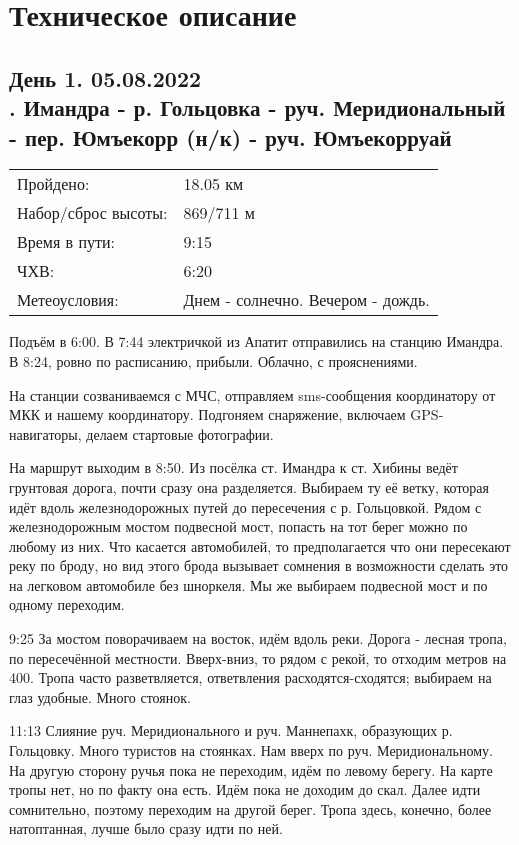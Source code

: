 \section{Техническое описание}
\subsection{День 1. 05.08.2022\\
. Имандра - р. Гольцовка - руч. Меридиональный - пер. Юмъекорр (н/к) - руч. Юмъекорруай}
\begin{tabular}{l p{12cm}}
\hline
Пройдено: & 18.05 км\\
Набор/сброс высоты: & 869/711 м\\
Время в пути: & 9:15\\
ЧХВ: & 6:20\\
Метеоусловия: & Днем - солнечно. Вечером - дождь.\\
\hline
\end{tabular}

Подъём в 6:00.
В 7:44 электричкой из Апатит отправились на станцию Имандра. В 8:24, ровно по расписанию, прибыли. Облачно, с прояснениями.

На станции созваниваемся с МЧС, отправляем sms-сообщения координатору от МКК и нашему координатору.
Подгоняем снаряжение, включаем GPS-навигаторы, делаем стартовые фотографии.

На маршрут выходим в 8:50. Из посёлка ст. Имандра к ст. Хибины ведёт грунтовая дорога, почти сразу она разделяется.
Выбираем ту её ветку, которая идёт вдоль железнодорожных путей до пересечения с р. Гольцовкой.
Рядом с железнодорожным мостом подвесной мост, попасть на тот берег можно по любому из них.
Что касается автомобилей, то предполагается что они пересекают реку по броду, но вид этого брода вызывает сомнения
в возможности сделать это на легковом автомобиле без шноркеля. Мы же выбираем подвесной мост и по одному переходим.

9:25 За мостом поворачиваем на восток, идём вдоль реки. Дорога - лесная тропа, по пересечённой местности.
Вверх-вниз, то рядом с рекой, то отходим метров на 400. Тропа часто разветвляется, ответвления расходятся-сходятся;
выбираем на глаз удобные. Много стоянок.

11:13 Слияние руч. Меридионального и руч. Маннепахк, образующих р. Гольцовку. Много туристов на стоянках.
Нам вверх по руч. Меридиональному. На другую сторону ручья пока не переходим, идём по левому берегу.
На карте тропы нет, но по факту она есть. Идём пока не доходим до скал. Далее идти сомнительно,
поэтому переходим на другой берег. Тропа здесь, конечно, более натоптанная, лучше было сразу идти по ней.

